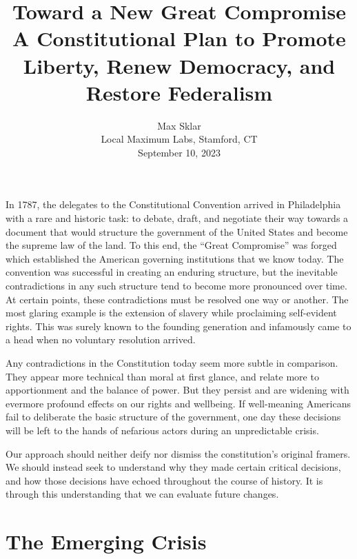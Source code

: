 \documentclass{article}
\newcommand{\quotes}[1]{``#1''}
\begin{document}
\parindent=0in
\parskip=12pt

\title{
  Toward a New Great Compromise \\
  \large{
    A Constitutional Plan to Promote Liberty, Renew Democracy, and Restore Federalism
  }
}

\author{Max Sklar \\ Local Maximum Labs, Stamford, CT \\ September 10, 2023}
\date{}

\maketitle

In 1787, the delegates to the Constitutional Convention arrived in Philadelphia with a rare and historic task: to debate, draft, and negotiate their way towards a document that would structure the government of the United States and become the supreme law of the land. To this end, the \quotes{Great Compromise} was forged which established the American governing institutions that we know today. The convention was successful in creating an enduring structure, but the inevitable contradictions in any such structure tend to become more pronounced over time. At certain points, these contradictions must be resolved one way or another. The most glaring example is the extension of slavery while proclaiming self-evident rights. This was surely known to the founding generation and infamously came to a head when no voluntary resolution arrived.

Any contradictions in the Constitution today seem more subtle in comparison. They appear more technical than moral at first glance, and relate more to apportionment and the balance of power. But they persist and are widening with evermore profound effects on our rights and wellbeing. If well-meaning Americans fail to deliberate the basic structure of the government, one day these decisions will be left to the hands of nefarious actors during an unpredictable crisis.

Our approach should neither deify nor dismiss the constitution's original framers. We should instead seek to understand why they made certain critical decisions, and how those decisions have echoed throughout the course of history. It is through this understanding that we can evaluate future changes.

\section{The Emerging Crisis}
\end{document}
